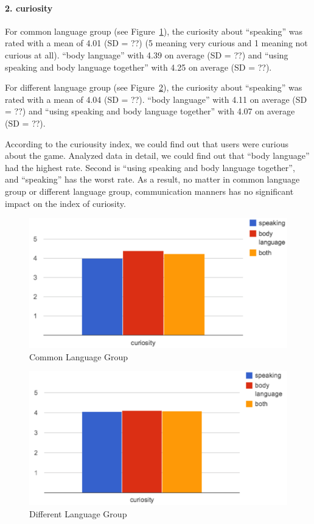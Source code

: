 \paragraph{2. curiosity}

For common language group (see Figure~\ref{fig:US_Curi_Com}), the curiosity about ``speaking'' was rated with a mean of 4.01 (SD = ??) (5 meaning very curious and 1 meaning not curious at all). ``body language'' with 4.39 on average (SD = ??) and ``using speaking and body language together'' with 4.25 on average (SD = ??).

For different language group (see Figure~\ref{fig:US_Curi_Dif}), the curiosity about ``speaking'' was rated with a mean of 4.04 (SD = ??). ``body language'' with 4.11 on average (SD = ??) and ``using speaking and body language together'' with 4.07 on average (SD = ??).

According to the curiousity index, we could find out that users were curious about the game. Analyzed data in detail, we could find out that ``body language'' had the highest rate. Second is ``using speaking and body language together'', and ``speaking'' has the worst rate. As a result, no matter in common language group or different language group, communication manners has no significant impact on the index of curiosity.


\begin{figure}[!h]
\centering
\includegraphics[width=0.9\columnwidth]{Figures/US_Curi_Com.png}
\caption{Common Language Group}
\label{fig:US_Curi_Com}
\end{figure}

\begin{figure}[!h]
\centering
\includegraphics[width=0.9\columnwidth]{Figures/US_Curi_Dif.png}
\caption{Different Language Group}
\label{fig:US_Curi_Dif}
\end{figure}


